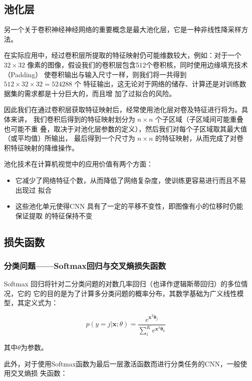 \subsection{池化层}

另一个关于卷积神经神经网络的重要概念是最大池化层，它是一种非线性降采样方法。

在实际应用中，经过卷积层所提取的特征映射仍可能维数较大，例如：对于一个 $32 \times
32$ 像素的图像，假设我们的卷积层包含512个卷积核，同时使用边缘填充技术（Padding）
使卷积输出与输入尺寸一样，则我们将一共得到 $512 \times 32 \times 32 = 524288$ 个
特征输出，这无论对于网络的储存、计算还是对训练数据集的需求都是十分巨大的，而且增
加了过拟合的风险。

因此我们在通过卷积层获取特征映射后，经常使用池化层对卷及特征进行将为。具体来讲，
我们卷积后得到的特征映射划分为 $n \times n$ 个子区域（子区域间可能重叠也可能不重
叠，取决于对池化层参数的定义），然后我们对每个子区域取其最大值（或平均值）所输出，
最后得到一个尺寸为 $n \times n$ 的特征映射，从而完成了对卷积特征映射的降维操作。

池化技术在计算机视觉中的应用价值有两个方面：

\begin{itemize}
\item 它减少了网络特征个数，从而降低了网络复杂度，使训练更容易进行而且不易出现过
  拟合
\item 这些池化单元使得CNN 具有了一定的平移不变性，即图像有小的位移时仍能保证提取
  的特征保持不变
\end{itemize}

\subsection{损失函数}

\subsubsection{分类问题——Softmax回归与交叉熵损失函数}

Softmax 回归将针对二分类问题的对数几率回归（也译作逻辑斯蒂回归）的多位情况，它的
它的目的是为了计算多分类问题的概率分布，其数学基础为广义线性模型，其定义式为：

\[
p(y=j|\mathbf{x};\theta) = \frac{e^{\mathbf{x}^T\mathbf{\theta}_j}}{\sum_{i}^{K}{e^{\mathbf{x}^T\mathbf{\theta}_k}}}
\]

其中$\theta$为参数。

此外，对于使用Softmax函数为最后一层激活函数而进行分类任务的CNN，一般使用交叉熵损
失函数：


